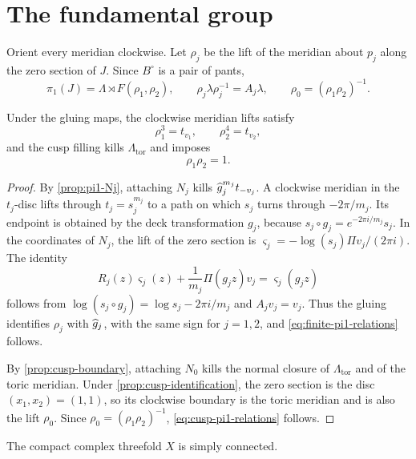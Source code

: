 \section{The fundamental group}
Orient every meridian clockwise.  Let $\rho_j$ be the lift of the meridian
about $p_j$ along the zero section of $J$.  Since $B^\circ$ is a pair of
pants,
\[
 \pi_1(J)=\Lambda\rtimes F(\rho_1,\rho_2),
 \qquad
 \rho_j\lambda\rho_j^{-1}=A_j\lambda,
 \qquad
 \rho_0=(\rho_1\rho_2)^{-1}.
\]

\begin{lemma}
\label{lem:filling-relations}
Under the gluing maps, the clockwise meridian lifts satisfy
\begin{equation}\label{eq:finite-pi1-relations}
 \rho_1^3=t_{v_1},
 \qquad
 \rho_2^4=t_{v_2},
\end{equation}
and the cusp filling kills $\Lambda_{\mathrm{tor}}$ and imposes
\begin{equation}\label{eq:cusp-pi1-relations}
 \rho_1\rho_2=1.
\end{equation}
\end{lemma}

\begin{proof}
By \cref{prop:pi1-Nj}, attaching $N_j$ kills
$\widehat g_j^{m_j}t_{-v_j}$.  A clockwise meridian in the $t_j$-disc lifts
through $t_j=s_j^{m_j}$ to a path on which $s_j$ turns through
$-2\pi/m_j$.  Its endpoint is obtained by the deck transformation
$g_j$, because $s_j\circ g_j=e^{-2\pi i/m_j}s_j$.  In the coordinates
of $N_j$, the lift of the zero section is
$\varsigma_j=-\log(s_j)\Pi v_j/(2\pi i)$.  The identity
\[
 R_j(z)\varsigma_j(z)+\frac1{m_j}\Pi(g_jz)v_j
 =\varsigma_j(g_jz)
\]
follows from $\log(s_j\circ g_j)=\log s_j-2\pi i/m_j$ and
$A_jv_j=v_j$.  Thus the gluing identifies $\rho_j$ with $\widehat g_j$, with
the same sign for $j=1,2$, and
\eqref{eq:finite-pi1-relations} follows.

By \cref{prop:cusp-boundary}, attaching $N_0$ kills the normal closure of
$\Lambda_{\mathrm{tor}}$ and of the toric meridian.  Under
\cref{prop:cusp-identification}, the zero section is the disc
$(x_1,x_2)=(1,1)$, so its clockwise boundary is the toric meridian and is
also the lift $\rho_0$.  Since $\rho_0=(\rho_1\rho_2)^{-1}$,
\eqref{eq:cusp-pi1-relations} follows.
\end{proof}

\begin{theorem}\label{thm:pi1}
The compact complex threefold $X$ is simply connected.
\end{theorem}

